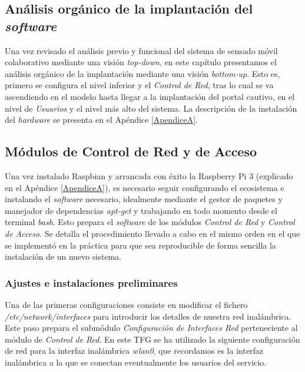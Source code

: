 \clearpage
{}
\begin{center}
\begin{minipage}{.75\textwidth}
\section{Análisis orgánico de la implantación del \emph{software}}

Una vez revisado el análisis previo y funcional del sistema de sensado móvil colaborativo mediante una visión \emph{top-down}, en este capítulo presentamos  el análisis orgánico de la implantación mediante una visión \emph{bottom-up}. Esto es, primero se configura el nivel inferior y el \emph{Control de Red}, tras lo cual se va ascendiendo en el modelo hasta llegar a la implantación del portal cautivo, en el nivel de \emph{Usuarios} y el nivel más alto del sistema. La descripción de la instalación del \emph{hardware} se presenta en el Apéndice \ref{ApendiceA}.
\end{minipage}
\end{center}
\clearpage%

\subsection{Módulos de Control de Red y de Acceso}
Una vez instalado Raspbian y arrancada con éxito la Raspberry Pi 3 (explicado en el Apéndice \ref{ApendiceA}), es necesario seguir configurando el ecosistema e instalando el \emph{software} necesario, idealmente mediante el gestor de paquetes y manejador de dependencias \emph{apt-get} y trabajando en todo momento desde el terminal \emph{bash}. Esto prepara el \emph{software} de los módulos \emph{Control de Red} y \emph{Control de Acceso}. Se detalla el procedimiento llevado a cabo en el mismo orden en el que se implementó en la práctica para que sea reproducible de forma sencilla la instalación de un nuevo sistema.

\subsubsection{Ajustes e instalaciones preliminares}
Una de las primeras configuraciones consiste en modificar el fichero \emph{/etc/network/interfaces} para introducir los detalles de nuestra red inalámbrica. Este paso prepara el submódulo \emph{Configuración de Interfaces Red} perteneciente al módulo de \emph{Control de Red}. En este TFG se ha utilizado la siguiente configuración de red para la interfaz inalámbrica \emph{wlan0}, que recordamos es la interfaz inalámbrica a la que se conectan eventualmente los usuarios del servicio.

